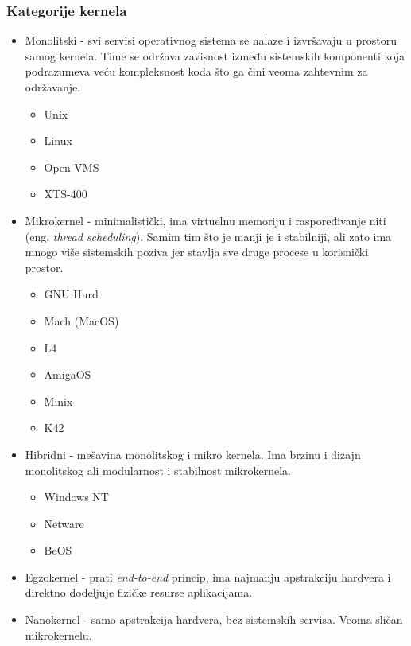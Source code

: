 \documentclass[a4paper,14pt]{article}
\begin{document}
\subsubsection{Kategorije kernela\cite{kernelcats}}
\begin{itemize}
\item Monolitski - svi servisi operativnog sistema se nalaze i izvršavaju u prostoru samog kernela. Time se održava zavisnost između sistemskih komponenti koja podrazumeva veću kompleksnost koda što ga čini veoma zahtevnim za održavanje.
\begin{itemize}
\item Unix
\item Linux
\item Open VMS
\item XTS-400
\end{itemize}
\item Mikrokernel - minimalistički, ima virtuelnu memoriju i raspoređivanje niti (eng. \textit{thread scheduling}). Samim tim što je manji je i stabilniji, ali zato ima mnogo više sistemskih poziva jer stavlja sve druge procese u korisnički prostor.
\begin{itemize}
\item GNU Hurd
\item Mach (MacOS)
\item L4
\item AmigaOS
\item Minix
\item K42
\end{itemize}
\item Hibridni - mešavina monolitskog i mikro kernela. Ima brzinu i dizajn monolitskog ali modularnost i stabilnost mikrokernela.
\begin{itemize}
\item Windows NT
\item Netware
\item BeOS
\end{itemize}
\item Egzokernel - prati \textit{end-to-end} princip, ima najmanju apstrakciju hardvera i direktno dodeljuje fizičke resurse aplikacijama.
\item Nanokernel - samo apstrakcija hardvera, bez sistemskih servisa. Veoma sličan mikrokernelu.
\end{itemize}
\newpage
\end{document}
